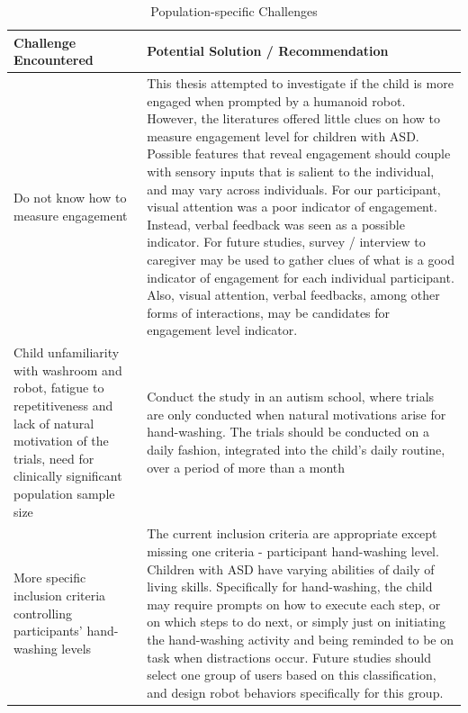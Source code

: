 \begin{table}[H]
	\centering
	\begin{tabular}{ | p{5cm} | p{10cm} | }
		\hline
		\textbf{Challenge Encountered}	&	\textbf{Potential Solution / Recommendation} \\	\hline
		Do not know how to measure engagement	&	This thesis attempted to investigate if the child is more engaged when prompted by a humanoid robot.  However, the literatures offered little clues on how to measure engagement level for children with ASD.  Possible features that reveal engagement should couple with sensory inputs that is salient to the individual, and may vary across individuals.  For our participant, visual attention was a poor indicator of engagement.  Instead, verbal feedback was seen as a possible indicator.  For future studies, survey / interview to caregiver may be used to gather clues of what is a good indicator of engagement for each individual participant.  Also, visual attention, verbal feedbacks, among other forms of interactions, may be candidates for engagement level indicator.	\\	\hline
		Child unfamiliarity with washroom and robot, fatigue to repetitiveness and lack of natural motivation of the trials, need for clinically significant population sample size	&	Conduct the study in an autism school, where trials are only conducted when natural motivations arise for hand-washing.  The trials should be conducted on a daily fashion, integrated into the child's daily routine, over a period of more than a month	\\	\hline
		More specific inclusion criteria controlling participants' hand-washing levels	&	The current inclusion criteria are appropriate except missing one criteria - participant hand-washing level.  Children with ASD have varying abilities of daily of living skills.  Specifically for hand-washing, the child may require prompts on how to execute each step, or on which steps to do next, or simply just on initiating the hand-washing activity and being reminded to be on task when distractions occur.  Future studies should select one group of users based on this classification, and design robot behaviors specifically for this group.	\\	\hline
	\end{tabular}
	\caption{Population-specific Challenges}
	\label{tab:PopulationChallenge}
\end{table}



